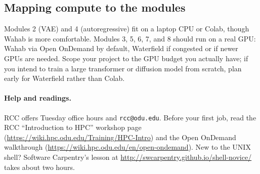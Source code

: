 \documentclass[11pt]{article}
\theoremstyle{remark}
\begin{document}
\subsection{Mapping compute to the modules}

Modules 2 (VAE) and 4 (autoregressive) fit on a laptop CPU or Colab, though Wahab is more comfortable. Modules 3, 5, 6, 7, and 8 should run on a real GPU: Wahab via Open OnDemand by default, Waterfield if congested or if newer GPUs are needed. Scope your project to the GPU budget you actually have; if you intend to train a large transformer or diffusion model from scratch, plan early for Waterfield rather than Colab.

\paragraph{Help and readings.} RCC offers Tuesday office hours and \texttt{rcc@odu.edu}. Before your first job, read the RCC ``Introduction to HPC'' workshop page (\url{https://wiki.hpc.odu.edu/Training/HPC-Intro}) and the Open OnDemand walkthrough (\url{https://wiki.hpc.odu.edu/en/open-ondemand}). New to the UNIX shell? Software Carpentry's lesson at \url{http://swcarpentry.github.io/shell-novice/} takes about two hours.
\end{document}
